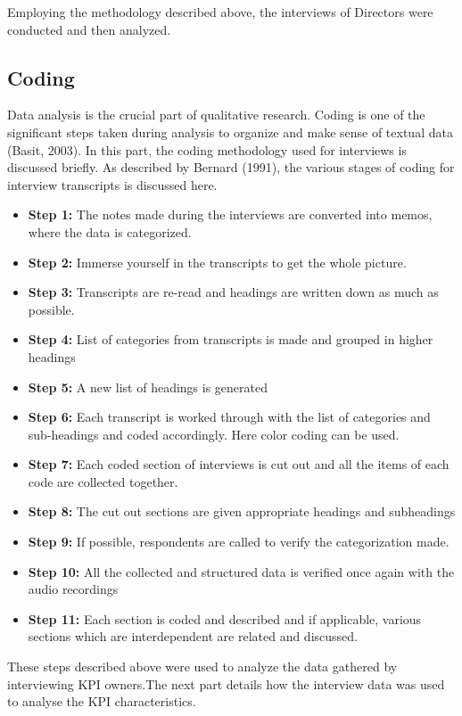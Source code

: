 Employing the methodology described above, the interviews of Directors were conducted and then analyzed.\\

\subsection{Coding}
Data analysis is the crucial part of qualitative research. Coding is one of the significant steps taken during analysis to organize and make sense of textual data (Basit, 2003). In this part, the coding methodology used for interviews is discussed briefly. As described by Bernard (1991), the various stages of coding for interview transcripts is discussed here.\\


\begin{itemize}
    \item \textbf{Step 1:} The notes made during the interviews are converted into memos, where the data is categorized.\\
    \item \textbf{Step 2:} Immerse yourself in the transcripts to get the whole picture.\\
    \item \textbf{Step 3:} Transcripts are re-read and headings are written down as much as possible.\\
    \item \textbf{Step 4:} List of categories from transcripts is made and grouped in higher headings\\
    \item \textbf{Step 5:} A new list of headings is generated \\
    \item \textbf{Step 6:} Each transcript is worked through with the list of categories and sub-headings and coded accordingly. Here color coding can be used.\\
    \item \textbf{Step 7:} Each coded section of interviews is cut out and all the items of each code are collected together.\\
    \item \textbf{Step 8:} The cut out sections are given appropriate headings and subheadings\\
    \item \textbf{Step 9:} If possible, respondents are called to verify the categorization made.\\
    \item \textbf{Step 10:} All the collected and structured data is verified once again with the audio recordings \\
    \item \textbf{Step 11:} Each section is coded and described and if applicable, various sections which are interdependent are related and discussed.\\
\end{itemize}
These steps described above were used to analyze the data gathered by interviewing KPI owners.The next part details how the interview data was used to analyse the KPI characteristics.\\

